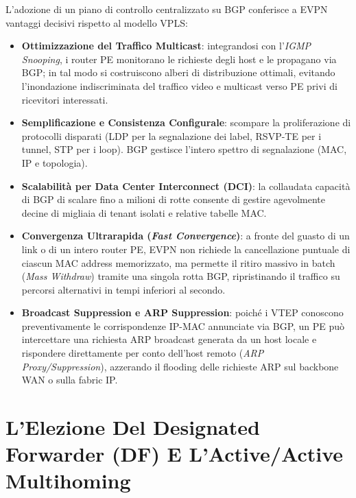\documentclass[11pt, a4paper]{article}
\begin{document}
L'adozione di un piano di controllo centralizzato su BGP conferisce a EVPN vantaggi decisivi rispetto al modello VPLS:
\begin{itemize}
    \item \textbf{Ottimizzazione del Traffico Multicast}: integrandosi con l'\emph{IGMP Snooping}, i router PE monitorano le richieste degli host e le propagano via BGP; in tal modo si costruiscono alberi di distribuzione ottimali, evitando l'inondazione indiscriminata del traffico video e multicast verso PE privi di ricevitori interessati.
    \item \textbf{Semplificazione e Consistenza Configurale}: scompare la proliferazione di protocolli disparati (LDP per la segnalazione dei label, RSVP-TE per i tunnel, STP per i loop). BGP gestisce l'intero spettro di segnalazione (MAC, IP e topologia).
    \item \textbf{Scalabilità per Data Center Interconnect (DCI)}: la collaudata capacità di BGP di scalare fino a milioni di rotte consente di gestire agevolmente decine di migliaia di tenant isolati e relative tabelle MAC.
    \item \textbf{Convergenza Ultrarapida (\emph{Fast Convergence})}: a fronte del guasto di un link o di un intero router PE, EVPN non richiede la cancellazione puntuale di ciascun MAC address memorizzato, ma permette il ritiro massivo in batch (\emph{Mass Withdraw}) tramite una singola rotta BGP, ripristinando il traffico su percorsi alternativi in tempi inferiori al secondo.
    \item \textbf{Broadcast Suppression e ARP Suppression}: poiché i VTEP conoscono preventivamente le corrispondenze IP-MAC annunciate via BGP, un PE può intercettare una richiesta ARP broadcast generata da un host locale e rispondere direttamente per conto dell'host remoto (\emph{ARP Proxy/Suppression}), azzerando il flooding delle richieste ARP sul backbone WAN o sulla fabric IP.
\end{itemize}


\section{L'Elezione Del Designated Forwarder (DF) E L'Active/Active Multihoming}
\end{document}

